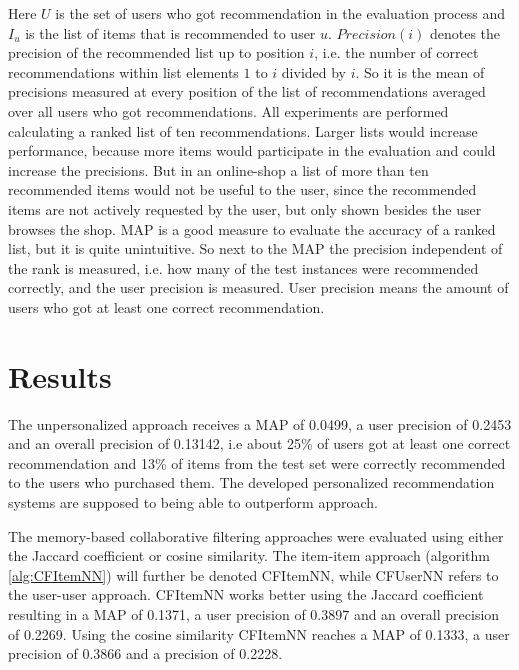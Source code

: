 \documentclass[10pt]{reportMaster}
\begin{document}
Here $U$ is the set of users who got recommendation in the evaluation process and $I_u$ is the list of items that is recommended to user $u$.
$Precision(i)$ denotes the precision of the recommended list up to position $i$, i.e. the number of correct recommendations within list elements $1$ to $i$ divided by $i$.
So it is the mean of precisions measured at every position of the list of recommendations averaged over all users who got recommendations.
All experiments are performed calculating a ranked list of ten recommendations.
Larger lists would increase performance, because more items would participate in the evaluation and could increase the precisions. %
But in an online-shop a list of more than ten recommended items would not be useful to the user, since the recommended items are not actively requested by the user, but only shown besides the user browses the shop.
MAP is a good measure to evaluate the accuracy of a ranked list, but it is quite unintuitive.
So next to the MAP the precision independent of the rank is measured, i.e. how many of the test instances were recommended correctly, and the user precision is measured.
User precision means the amount of users who got at least one correct recommendation.


\section{Results}
\label{sec:results}
The unpersonalized approach receives a MAP of 0.0499, a user precision of 0.2453 and an overall precision of 0.13142, i.e about 25\% of users got at least one correct recommendation and 13\% of items from the test set were correctly recommended to the users who purchased them.
The developed personalized recommendation systems are supposed to being able to outperform approach.

The memory-based collaborative filtering approaches were evaluated using either the Jaccard coefficient or cosine similarity.
The item-item approach (algorithm \ref{alg:CFItemNN}) will further be denoted CFItemNN, while CFUserNN refers to the user-user approach.
CFItemNN works better using the Jaccard coefficient resulting in a MAP of 0.1371, a user precision of 0.3897 and an overall precision of 0.2269.
Using the cosine similarity CFItemNN reaches a MAP of 0.1333, a user precision of 0.3866 and a precision of 0.2228.
\end{document}
